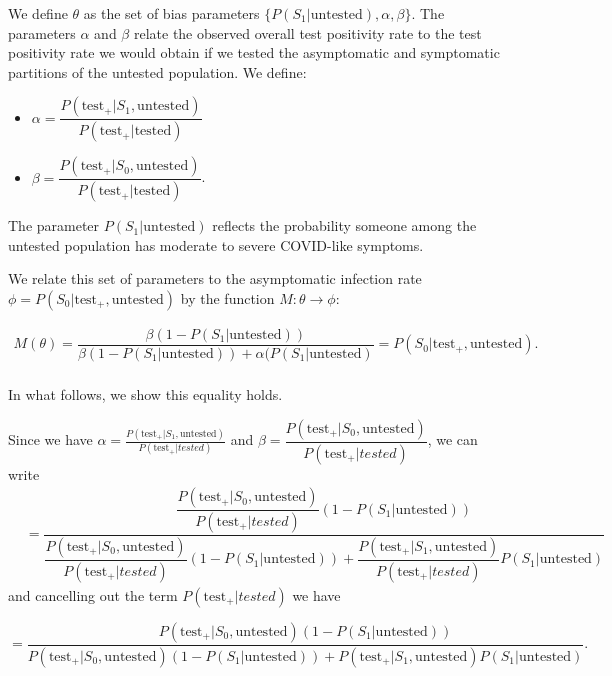 \documentclass[12pt,twoside]{smiththesis}
\providecommand{\tightlist}{%
  \setlength{\itemsep}{0pt}\setlength{\parskip}{0pt}}
\begin{document}
\indent We define \(\theta\) as the set of bias parameters \(\{P(S_1|\text{untested}), \alpha, \beta \}\). The parameters \(\alpha\) and \(\beta\) relate the observed overall test positivity rate to the test positivity rate we would obtain if we tested the asymptomatic and symptomatic partitions of the untested population. We define:
\begin{itemize}
\tightlist
\item
  \(\alpha = \dfrac{P(\text{test}_+|S_1,\text{untested})}{P(\text{test}_+|\text{tested})}\)
\item
  \(\beta = \dfrac{P(\text{test}_+|S_0,\text{untested})}{P(\text{test}_+|\text{tested})}\).
\end{itemize}
The parameter \(P(S_1|\text{untested})\) reflects the probability someone among the untested population has moderate to severe COVID-like symptoms.

We relate this set of parameters to the asymptomatic infection rate \(\phi = P(S_0|\text{test}_+, \text{untested})\) by the function \(M: \theta \to \phi\):
\begin{tcolorbox}
\vspace{2 mm}
\begin{align*}   
 M(\theta)  = \dfrac{\beta (1- P(S_1|\text{untested}))}{\beta(1- P(S_1|\text{untested})) + \alpha(P(S_1|\text{untested})} = P(S_0|\text{test}_+, \text{untested}).\\
\end{align*}
\end{tcolorbox}
In what follows, we show this equality holds.

\noindent Since we have \(\alpha = \frac{P(\text{test}_+|S_1, \text{untested})}{P(\text{test}_+|tested)}\) and \(\beta = \dfrac{P(\text{test}_+|S_0, \text{untested})}{P(\text{test}_+|tested)}\), we can write
\begin{align*}  &= \dfrac{\dfrac{P(\text{test}_+|S_0, \text{untested})}{P(\text{test}_+|tested)}(1 - P(S_1|\text{untested}))}{\dfrac{P(\text{test}_+|S_0, \text{untested})}{P(\text{test}_+|tested)}(1-P(S_1|\text{untested})) + \dfrac{P(\text{test}_+|S_1, \text{untested})}{P(\text{test}_+|tested)} P(S_1|\text{untested})}
\end{align*}
and cancelling out the term \(P(\text{test}_+|tested)\) we have

\[ = \dfrac{{P(\text{test}_+|S_0, \text{untested})}(1 - P(S_1|\text{untested}))}{P(\text{test}_+|S_0, \text{untested})(1-P(S_1|\text{untested})) + P(\text{test}_+|S_1, \text{untested}) P(S_1|\text{untested})}.\]
\end{document}
